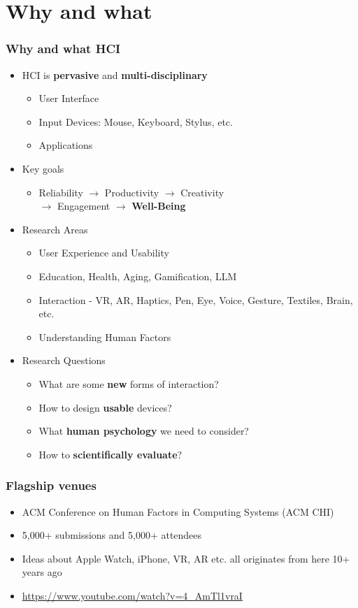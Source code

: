 \documentclass{beamer}
\begin{document}
\section{Why and what} %

\begin{frame}
\frametitle{Why and what HCI}
\begin{itemize}
	\item HCI is \textbf{pervasive} and \textbf{multi-disciplinary}
	\begin{itemize}
		\item User Interface
		\item Input Devices: Mouse, Keyboard, Stylus, etc.
		\item Applications
	\end{itemize}
	\item Key goals
	\begin{itemize}
		\item Reliability $\rightarrow$ Productivity $\rightarrow$ Creativity \\  $\rightarrow$ Engagement $\rightarrow$ \textbf{Well-Being }
	\end{itemize}
	\item Research Areas
	\begin{itemize}
		\item User Experience and Usability
		\item Education, Health, Aging, Gamification, LLM
		\item Interaction - VR, AR, Haptics, Pen, Eye, Voice, Gesture, Textiles, Brain, etc.
		\item Understanding Human Factors
	\end{itemize}
	\item Research Questions
	\begin{itemize}
		\item What are some \textbf{new} forms of interaction?
		\item How to design \textbf{usable} devices?
		\item What \textbf{human psychology} we need to consider?
		\item How to \textbf{scientifically evaluate}?
	\end{itemize}
\end{itemize}
\end{frame}

\begin{frame}
\frametitle{Flagship venues}
\begin{itemize}
	\item ACM Conference on Human Factors in Computing Systems (ACM CHI)
	\item 5,000+ submissions and 5,000+ attendees
	\item Ideas about Apple Watch, iPhone, VR, AR etc. all originates from here 10+ years ago
	\item \url{https://www.youtube.com/watch?v=4_AmTl1vraI}
\end{itemize}
\end{frame}
\end{document}
